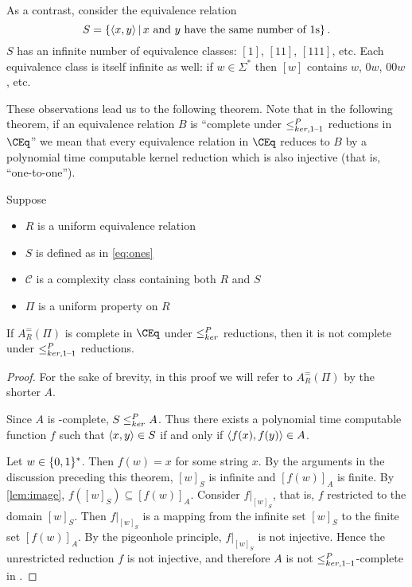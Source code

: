 As a contrast, consider the equivalence relation
\begin{equation}\label{eq:ones}
  S = \left\{\left\langle x,y\right\rangle \,\middle|\, x\text{ and }y\text{ have the same number of }1\textnormal{s}\right\}.
\end{equation}
$S$ has an infinite number of equivalence classes: $[1]$, $[11]$, $[111]$, etc.
Each equivalence class is itself infinite as well: if $w\in\Sigma^*$ then $[w]$ contains $w$, $0w$, $00w$, etc.

These observations lead us to the following theorem.
Note that in the following theorem, if an equivalence relation $B$ is ``complete under $\leq^{P}_{ker,1\text{--}1}$ reductions in $\CEq$'' we mean that every equivalence relation in $\CEq$ reduces to $B$ by a polynomial time computable kernel reduction which is also injective (that is, ``one-to-one'').

\begin{theorem}
  Suppose
  \begin{itemize}
  \item $R$ is a uniform equivalence relation
  \item $S$ is defined as in \eqref{eq:ones}
  \item $\mathcal{C}$ is a complexity class containing both $R$ and $S$
  \item $\Pi$ is a uniform property on $R$
  \end{itemize}
  If $A_R^=(\Pi)$ is complete in $\CEq$ under $\leq^{P}_{ker}$ reductions, then it is not complete under $\leq^{P}_{ker,1\text{--}1}$ reductions.
\end{theorem}
\begin{proof}
  For the sake of brevity, in this proof we will refer to $A_R^=(\Pi)$ by the shorter $A$.

  Since $A$ is \CEq-complete, $S \leq^{P}_{ker} A$.
  Thus there exists a polynomial time computable function $f$ such that $\left\langle x,y\right\rangle\in S$ if and only if $\left\langle f(x),f(y)\right\rangle\in A$.

  Let $w\in\{0, 1\}^{*}$.
  Then $f(w)=x$ for some string $x$.
  By the arguments in the discussion preceding this theorem, $[w]_S$ is infinite and $[f(w)]_A$ is finite.
  By \autoref{lem:image}, $f([w]_S)\subseteq [f(w)]_A$.
  Consider $f|_{[w]_S}$, that is, $f$ restricted to the domain $[w]_S$.
  Then $f|_{[w]_S}$ is a mapping from the infinite set $[w]_S$ to the finite set $[f(w)]_A$.
  By the pigeonhole principle, $f|_{[w]_S}$ is not injective.
  Hence the unrestricted reduction $f$ is not injective, and therefore $A$ is not $\leq^{P}_{ker,1\text{--}1}$-complete in \CEq.
\end{proof}

